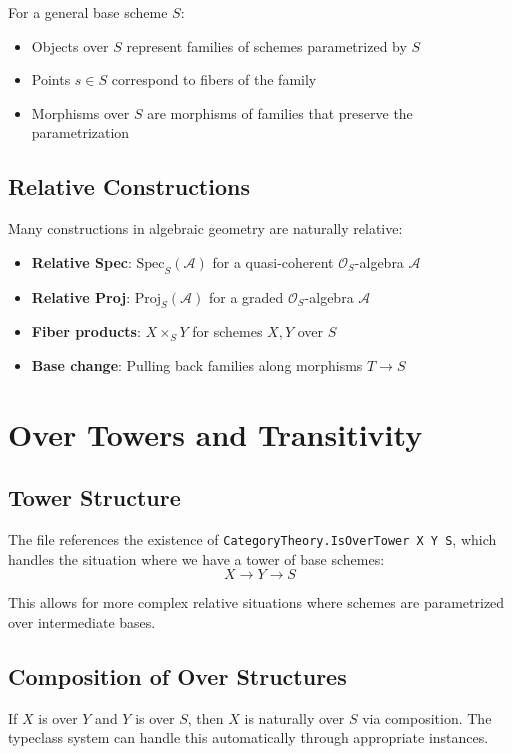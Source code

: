 \documentclass{article}
\theoremstyle{definition}
\begin{document}
For a general base scheme $S$:
\begin{itemize}
\item Objects over $S$ represent families of schemes parametrized by $S$
\item Points $s \in S$ correspond to fibers of the family
\item Morphisms over $S$ are morphisms of families that preserve the parametrization
\end{itemize}

\subsection{Relative Constructions}

Many constructions in algebraic geometry are naturally relative:
\begin{itemize}
\item \textbf{Relative Spec}: $\mathrm{Spec}_S(\mathcal{A})$ for a quasi-coherent $\mathcal{O}_S$-algebra $\mathcal{A}$
\item \textbf{Relative Proj}: $\mathrm{Proj}_S(\mathcal{A})$ for a graded $\mathcal{O}_S$-algebra $\mathcal{A}$
\item \textbf{Fiber products}: $X \times_S Y$ for schemes $X, Y$ over $S$
\item \textbf{Base change}: Pulling back families along morphisms $T \to S$
\end{itemize}

\section{Over Towers and Transitivity}

\subsection{Tower Structure}

The file references the existence of \texttt{CategoryTheory.IsOverTower X Y S}, which handles the situation where we have a tower of base schemes:
\[
X \to Y \to S
\]

This allows for more complex relative situations where schemes are parametrized over intermediate bases.

\subsection{Composition of Over Structures}

If $X$ is over $Y$ and $Y$ is over $S$, then $X$ is naturally over $S$ via composition. The typeclass system can handle this automatically through appropriate instances.
\end{document}
